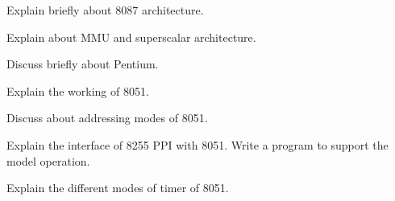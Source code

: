\newpage \again

\item Explain briefly about 8087 architecture.
\ene

\item \iitem Explain about MMU and superscalar architecture.
\Or
\item Discuss briefly about Pentium.
\ene

\item \iitem Explain the working of 8051.
\Or
\item Discuss about addressing modes of 8051.
\ene

\item \iitem Explain the interface of 8255 PPI with 8051. Write a program
  to support the model operation.
\Or
\item Explain the different modes of timer of 8051.
\ene

\markC
\ene
